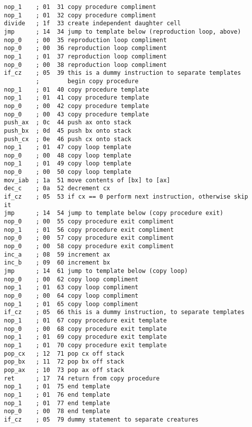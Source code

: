 \begin{verbatim}
nop_1    ; 01  31 copy procedure compliment
nop_1    ; 01  32 copy procedure compliment
divide   ; 1f  33 create independent daughter cell
jmp      ; 14  34 jump to template below (reproduction loop, above)
nop_0    ; 00  35 reproduction loop compliment
nop_0    ; 00  36 reproduction loop compliment
nop_1    ; 01  37 reproduction loop compliment
nop_0    ; 00  38 reproduction loop compliment
if_cz    ; 05  39 this is a dummy instruction to separate templates
         ;        begin copy procedure
nop_1    ; 01  40 copy procedure template
nop_1    ; 01  41 copy procedure template
nop_0    ; 00  42 copy procedure template
nop_0    ; 00  43 copy procedure template
push_ax  ; 0c  44 push ax onto stack
push_bx  ; 0d  45 push bx onto stack
push_cx  ; 0e  46 push cx onto stack
nop_1    ; 01  47 copy loop template
nop_0    ; 00  48 copy loop template
nop_1    ; 01  49 copy loop template
nop_0    ; 00  50 copy loop template
mov_iab  ; 1a  51 move contents of [bx] to [ax]
dec_c    ; 0a  52 decrement cx
if_cz    ; 05  53 if cx == 0 perform next instruction, otherwise skip it
jmp      ; 14  54 jump to template below (copy procedure exit)
nop_0    ; 00  55 copy procedure exit compliment
nop_1    ; 01  56 copy procedure exit compliment
nop_0    ; 00  57 copy procedure exit compliment
nop_0    ; 00  58 copy procedure exit compliment
inc_a    ; 08  59 increment ax
inc_b    ; 09  60 increment bx
jmp      ; 14  61 jump to template below (copy loop)
nop_0    ; 00  62 copy loop compliment
nop_1    ; 01  63 copy loop compliment
nop_0    ; 00  64 copy loop compliment
nop_1    ; 01  65 copy loop compliment
if_cz    ; 05  66 this is a dummy instruction, to separate templates
nop_1    ; 01  67 copy procedure exit template
nop_0    ; 00  68 copy procedure exit template
nop_1    ; 01  69 copy procedure exit template
nop_1    ; 01  70 copy procedure exit template
pop_cx   ; 12  71 pop cx off stack
pop_bx   ; 11  72 pop bx off stack
pop_ax   ; 10  73 pop ax off stack
ret      ; 17  74 return from copy procedure
nop_1    ; 01  75 end template
nop_1    ; 01  76 end template
nop_1    ; 01  77 end template
nop_0    ; 00  78 end template
if_cz    ; 05  79 dummy statement to separate creatures
\end{verbatim}

